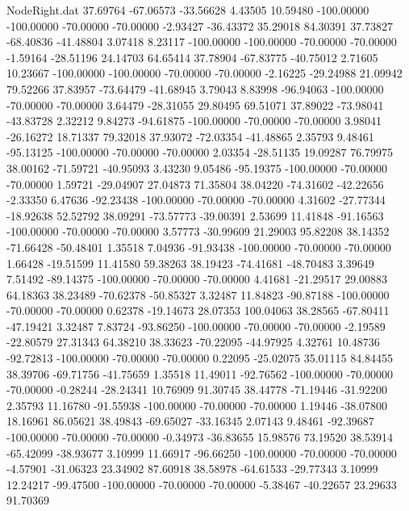\begin{filecontents}{NodeRight.dat}
  37.69764  -67.06573  -33.56628     4.43505   10.59480 -100.00000 -100.00000  -70.00000  -70.00000   -2.93427  -36.43372   35.29018   84.30391
  37.73827  -68.40836  -41.48804     3.07418    8.23117 -100.00000 -100.00000  -70.00000  -70.00000   -1.59164  -28.51196   24.14703   64.65414
  37.78904  -67.83775  -40.75012     2.71605   10.23667 -100.00000 -100.00000  -70.00000  -70.00000   -2.16225  -29.24988   21.09942   79.52266
  37.83957  -73.64479  -41.68945     3.79043    8.83998  -96.94063 -100.00000  -70.00000  -70.00000    3.64479  -28.31055   29.80495   69.51071
  37.89022  -73.98041  -43.83728     2.32212    9.84273  -94.61875 -100.00000  -70.00000  -70.00000    3.98041  -26.16272   18.71337   79.32018
  37.93072  -72.03354  -41.48865     2.35793    9.48461  -95.13125 -100.00000  -70.00000  -70.00000    2.03354  -28.51135   19.09287   76.79975
  38.00162  -71.59721  -40.95093     3.43230    9.05486  -95.19375 -100.00000  -70.00000  -70.00000    1.59721  -29.04907   27.04873   71.35804
  38.04220  -74.31602  -42.22656    -2.33350    6.47636  -92.23438 -100.00000  -70.00000  -70.00000    4.31602  -27.77344  -18.92638   52.52792
  38.09291  -73.57773  -39.00391     2.53699   11.41848  -91.16563 -100.00000  -70.00000  -70.00000    3.57773  -30.99609   21.29003   95.82208
  38.14352  -71.66428  -50.48401     1.35518    7.04936  -91.93438 -100.00000  -70.00000  -70.00000    1.66428  -19.51599   11.41580   59.38263
  38.19423  -74.41681  -48.70483     3.39649    7.51492  -89.14375 -100.00000  -70.00000  -70.00000    4.41681  -21.29517   29.00883   64.18363
  38.23489  -70.62378  -50.85327     3.32487   11.84823  -90.87188 -100.00000  -70.00000  -70.00000    0.62378  -19.14673   28.07353  100.04063
  38.28565  -67.80411  -47.19421     3.32487    7.83724  -93.86250 -100.00000  -70.00000  -70.00000   -2.19589  -22.80579   27.31343   64.38210
  38.33623  -70.22095  -44.97925     4.32761   10.48736  -92.72813 -100.00000  -70.00000  -70.00000    0.22095  -25.02075   35.01115   84.84455
  38.39706  -69.71756  -41.75659     1.35518   11.49011  -92.76562 -100.00000  -70.00000  -70.00000   -0.28244  -28.24341   10.76909   91.30745
  38.44778  -71.19446  -31.92200     2.35793   11.16780  -91.55938 -100.00000  -70.00000  -70.00000    1.19446  -38.07800   18.16961   86.05621
  38.49843  -69.65027  -33.16345     2.07143    9.48461  -92.39687 -100.00000  -70.00000  -70.00000   -0.34973  -36.83655   15.98576   73.19520
  38.53914  -65.42099  -38.93677     3.10999   11.66917  -96.66250 -100.00000  -70.00000  -70.00000   -4.57901  -31.06323   23.34902   87.60918
  38.58978  -64.61533  -29.77343     3.10999   12.24217  -99.47500 -100.00000  -70.00000  -70.00000   -5.38467  -40.22657   23.29633   91.70369

\end{filecontents}
